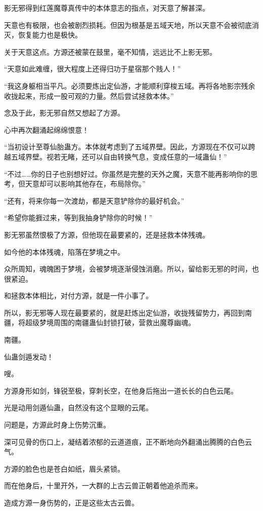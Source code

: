 \begin{this_body}
影无邪得到红莲魔尊真传中的本体意志的指点，对天意了解甚深。

天意也有极限，也会被剧烈损耗。但因为根基是五域天地，所以天意不会被彻底消灭，恢复能力也是极快。

关于天意这点。方源还被蒙在鼓里，毫不知情，远远比不上影无邪。

“天意如此难缠，很大程度上还得归功于星宿那个贱人！”

“我这身躯相当平凡。必须要炼出定仙游，才能顺利穿梭五域。再将各地影宗残余收拢起来，形成一股可观的力量。然后尝试拯救本体。”

念及于此，影无邪自然又想起了方源。

心中再次翻涌起绵绵恨意！

“当初设计至尊仙胎蛊方。本体就考虑到了五域界壁。因此，方源现在不仅可以跨越五域界壁。视若无睹，还可以自由转换气息，变成任意的一域蛊仙！”

“不过……你的日子也别想好过。你虽然是完整的天外之魔，天意不能再影响你的思考，但天意却可以影响其他存在，布局除你。”

“还有，将来你每一次渡劫，都是天意铲除你的最好机会。”

“希望你能捱过来，等到我抽身铲除你的时候！”

影无邪虽然恨极了方源，但他现在最要紧的，还是拯救本体残魂。

如今他的本体残魂，陷落在梦境之中。

众所周知，魂魄困于梦境，会被梦境逐渐侵蚀消磨。所以，留给影无邪的时间，也很紧迫。

和拯救本体相比，对付方源，就是一件小事了。

所以，影无邪等人现在最要紧的，就是赶炼出定仙游，收拢残留势力，再回到南疆，将超级梦境周围的南疆蛊仙封锁打破，营救出魔尊幽魂。

南疆。

仙蛊剑遁发动！

嗖。

方源身形如剑，锋锐至极，穿刺长空，在他身后拖出一道长长的白色云尾。

光是动用剑遁仙蛊，自然没有这个显眼的云尾。

问题是，方源此时身上伤势沉重。

深可见骨的伤口上，凝结着浓郁的云道道痕，正不断地向外翻涌出腾腾的白色云气。

方源的脸色也是苍白如纸，眉头紧锁。

而在他身后，十里开外，一大群的上古云兽正朝着他追杀而来。

造成方源一身伤势的，正是这些太古云兽。


\end{this_body}
